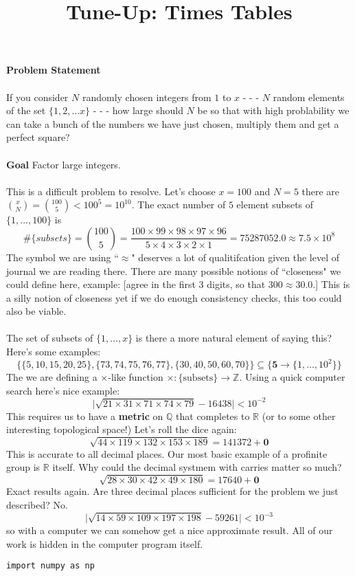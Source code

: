 \documentclass[12pt]{article}
\title{Tune-Up: Times Tables}
\date{}
\begin{document}
\sffamily

\maketitle

{\fontsize{16pt}{16pt}\selectfont 

\noindent  \textbf{Problem Statement} \\ \\
If you consider $N$ randomly chosen integers from $1$ to $x$  - - - $N$ random elements of the set $\{ 1, 2, \dots x\}$ - - - how large should $N$ be so that with high problability we can take a bunch of the numbers we have just chosen, multiply them and get a perfect square? \\ \\
\textbf{Goal} Factor large integers. \\ \\
\noindent This is a difficult problem to resolve.  Let's choose $x = 100$ and $N = 5$ there are $\binom{x}{N} = \binom{100}{5}  < 100^5 = 10^{10} $.  The exact number of $5$ element subsets of $\{ 1, \dots, 100\}$ is 
$$ \# \{ subsets\} = \binom{100}{5} = \frac{100 \times 99 \times 98 \times 97 \times 96}{5 \times 4 \times 3 \times 2 \times 1} = 75287052.0 \approx   7.5 \times 10^8 $$
The symbol we are using ``$\approx$" deserves a lot of qualitifcation given the level of journal we are reading there.  There are many possible notions of ``closeness" we could define here, example: [agree in the first 3 digits, so that $300 \approx 30.0$.]  This is a silly notion of closeness yet if we do enough consistency checks, this too could also be viable. \\ \\
The set of subsets of $\{ 1, \dots, x\}$ is there a more natural element of saying this?  Here's some examples:
$$ \Big\{ \{ 5, 10, 15, 20, 25\}, \{ 73, 74, 75, 76, 77 \}, \{ 30, 40, 50, 60, 70 \} \Big\}  \subseteq \Big\{ \mathbf{5} \to \{ 1, \dots , 10^2 \} \Big\} $$
The we are defining a $\times$-like function $\times: \{ \text{subsets} \} \to \mathbb{Z}$.  Using a quick computer search here's nice example:
$$ \big| \sqrt{21 \times 31 \times 71 \times 74 \times 79 } - 16438 \big| < 10^{-2}$$
This requires us to have a \textbf{metric} on $\mathbb{Q}$ that completes to $\mathbb{R}$ (or to some other interesting topological space!) Let's roll the dice again:
$$ \sqrt{44 \times 119 \times 132 \times 153 \times 189} = 141372 + \mathbf{0} $$
This is accurate to all decimal places.  Our most basic example of a profinite group is $\mathbb{R}$ itself.  Why could the decimal systmem with carries matter so much?
$$ \sqrt{28 \times 30 \times 42 \times 49 \times 180} = 17640 + \mathbf{0} $$
Exact results again.  Are three decimal places sufficient for the problem we just described?  No.
$$ \Big| \sqrt{14 \times 59 \times 109 \times 197 \times 198} - 59261 \Big| < 10^{-3} $$
so with a computer we can somehow get a nice approximate result.  All of our work is hidden in the computer program itself. 
\begin{verbatim}
import numpy as np


\end{verbatim}}
\end{document}
